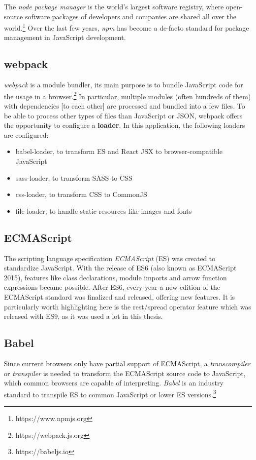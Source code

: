 \documentclass[a4paper,top=25mm,bottom=25mm,12pt,pdftex,halfparskip,twoside,bibtotoc,numbers=noenddot]{scrbook}
\begin{document}
The \textit{node package manager} is the world's largest software registry, where open-source software packages of developers and companies are shared all over the world.\footnote{https://www.npmjs.org} Over the last few years, \textit{npm} has become a de-facto standard for package management in JavaScript development.

\subsection{webpack}

\textit{webpack} is a module bundler, its main purpose is to bundle JavaScript code for the usage in a browser.\footnote{https://webpack.js.org} In particular, multiple modules (often hundreds of them) with dependencies [to each other] are processed and bundled into a few files. To be able to process other types of files than JavaScript or JSON, webpack offers the opportunity to configure a \textbf{loader}. In this application, the following loaders are configured:
\begin{itemize}
\item babel-loader, to transform ES and React JSX to browser-compatible JavaScript
\item sass-loader, to transform SASS to CSS
\item css-loader, to transform CSS to CommonJS
\item file-loader, to handle static resources like images and fonts
\end{itemize}

\subsection{ECMAScript}

The scripting language specification \textit{ECMAScript} (ES) was created to standardize JavaScript. With the release of ES6 (also known as ECMAScript 2015), features like class declarations, module imports and arrow function expressions became possible. After ES6, every year a new edition of the ECMAScript standard was finalized and released, offering new features. It is particularly worth highlighting here is the rest/spread operator feature which was released with ES9, as it was used a lot in this thesis.

\subsection{Babel}
Since current browsers only have partial support of ECMAScript, a \textit{transcompiler} or \textit{transpiler} is needed to transform the ECMAScript source code to JavaScript, which common browsers are capable of interpreting.
\textit{Babel} is an industry standard to transpile ES to common JavaScript or lower ES versions.\footnote{https://babeljs.io}
\end{document}
